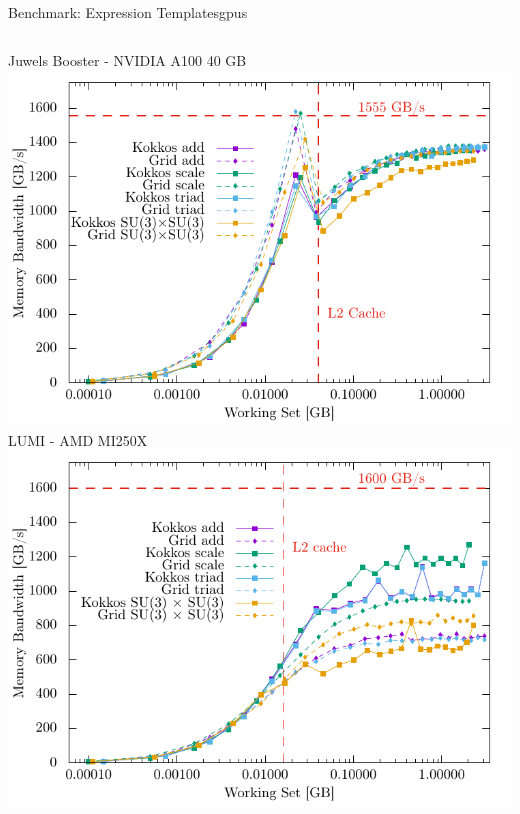 \begin{frame}{Benchmark: Expression Templates}{gpus}

  \begin{columns}
      Juwels Booster - NVIDIA A100 40 GB
      \includegraphics[width=\textwidth]{figs/gpu_mem_bw_mixed_policy.pdf}
      LUMI - AMD MI250X
      \includegraphics[width=\textwidth]{figs/lumi_results.pdf}
  \end{columns}
\end{frame}

